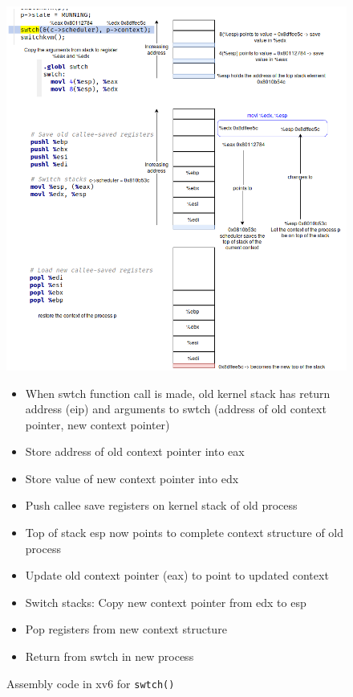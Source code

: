 \documentclass[12pt]{article}
\begin{document}
\begin{figure}[htbp]
    \begin{minipage}[t]{0.5\textwidth}
        \includegraphics[width=\textwidth]{context_switch.png}
    \end{minipage}%
    \begin{minipage}[t]{0.5\textwidth}
        \vspace{-8cm} 
        \begin{itemize}[topsep=0pt, partopsep=0pt, itemsep=0pt, parsep=0pt]
            \item  When swtch function call is made, old kernel stack has return address (eip)
        and arguments to swtch (address of old context pointer, new context pointer)
        \item  Store address of old context pointer into eax
        \item  Store value of new context pointer into edx
        \item  Push callee save registers on kernel stack of old process
        \item Top of stack esp now points to complete context structure of old process
        \item  Update old context pointer (eax) to point to updated context
        \item  Switch stacks: Copy new context pointer from edx to esp
        \item  Pop registers from new context structure
        \item  Return from swtch in new process
        
        \end{itemize}
     
    \end{minipage}
    \caption{Assembly code in xv6 for \texttt{swtch()}}
    \label{fig:parallel}
\end{figure}
\end{document}

